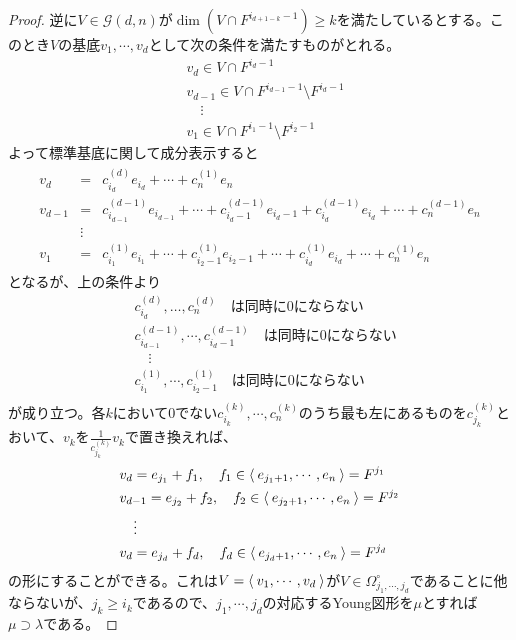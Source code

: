 \documentclass{ltjsreport}
\begin{document}
\begin{proof}
  逆に$V\in\mathcal{G}(d,n)$が$\dim(V\cap F^{i_{d+1-k}-1})\geq k$を満たしているとする。このとき$V$の基底$v_1,\cdots,v_d$として次の条件を満たすものがとれる。
  \begin{align*}
    &v_d\in V\cap F^{i_d-1}\\
    &v_{d-1}\in V\cap F^{i_{d-1}-1}\setminus F^{i_d-1}\\
    &\quad\vdots\\
    &v_1\in V\cap F^{i_1-1}\setminus F^{i_2-1}
  \end{align*}
  よって標準基底に関して成分表示すると
  \begin{align*}
    \begin{array}{ccr}
      v_d & = & c^{(d)}_{i_d}e_{i_d}+\cdots+c^{(1)}_{n}e_n\\
      v_{d-1} & = & c^{(d-1)}_{i_{d-1}}e_{i_{d-1}}+\cdots+c^{(d-1)}_{i_d-1}e_{i_d-1}+c^{(d-1)}_{i_d}e_{i_d}+\cdots+c^{(d-1)}_{n}e_n\\
          & \vdots & \\
      v_1 & = & c^{(1)}_{i_1}e_{i_1}+\cdots+c^{(1)}_{i_2-1}e_{i_2-1}+\cdots+c^{(1)}_{i_d}e_{i_d}+\cdots+c^{(1)}_{n}e_n
    \end{array}
  \end{align*}
  となるが、上の条件より
  \begin{align*}
    &c^{(d)}_{i_d},\dots,c^{(d)}_n\text{　は同時に$0$にならない}\\
    &c^{(d-1)}_{i_{d-1}},\cdots,c^{(d-1)}_{i_d-1}\text{　は同時に$0$にならない}\\
    &\quad\vdots\\
    &c^{(1)}_{i_1},\cdots,c^{(1)}_{i_2-1}\text{　は同時に$0$にならない}\\
  \end{align*}
  が成り立つ。各$k$において$0$でない$c^{(k)}_{i_{k}},\cdots,c^{(k)}_{n}$のうち最も左にあるものを$c^{(k)}_{j_k}$とおいて、$v_k$を$\frac{1}{c^{(k)}_{j_k}}v_k$で置き換えれば、
  \begin{align*}
    &v_d=e_{j_1}+f_1,\quad f_1\in\langle\:e_{j_1+1},\cdots,e_n\:\rangle=F^{j_1}\\
    &v_{d-1}=e_{j_2}+f_2,\quad f_2\in\langle\:e_{j_2+1},\cdots,e_n\:\rangle=F^{j_2}\\
    &\quad\vdots\\
    &v_d=e_{j_d}+f_d,\quad f_d\in\langle\:e_{j_d+1},\cdots,e_n\:\rangle=F^{j_d}
  \end{align*}
  の形にすることができる。これは$V=\langle\:v_1,\cdots,v_d\:\rangle$が$V\in\Omega_{j_1,\cdots,j_d}^\circ$であることに他ならないが、$j_k\geq i_k$であるので、$j_1,\cdots,j_d$の対応するYoung図形を$\mu$とすれば$\mu\supset\lambda$である。
\end{proof}
\end{document}
